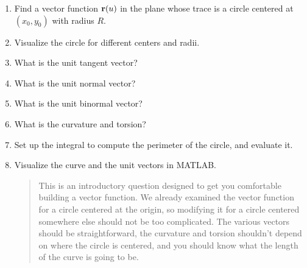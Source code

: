 \documentclass[M3_Night1_Solutions]{subfiles}
\begin{document}
\begin{enumerate}[series=exercises, label=\textbf{Exercise} (\arabic*)]
\item Find a vector function $\mathbf{r}(u)$ in the plane whose trace is a circle centered at $(x_0,y_0)$ with radius $R$. 
\be
\item Visualize the circle for different centers and radii. 
\item What is the unit tangent vector? 
\item What is the unit normal vector? 
\item What is the unit binormal vector? 
\item What is the curvature and torsion? 
\item Set up the integral to compute the perimeter of the circle, and evaluate it.
\item Visualize the curve and the unit vectors in MATLAB.
\ee
\begin{quote}
This is an introductory question designed to get you comfortable building a vector function. We already examined the vector function for a circle centered at the origin, so modifying it for a circle centered somewhere else should not be too complicated. The various vectors should be straightforward, the curvature and torsion shouldn't depend on where the circle is centered, and you should know what the length of the curve is going to be.
\end{quote}


\end{enumerate}
\end{document}
